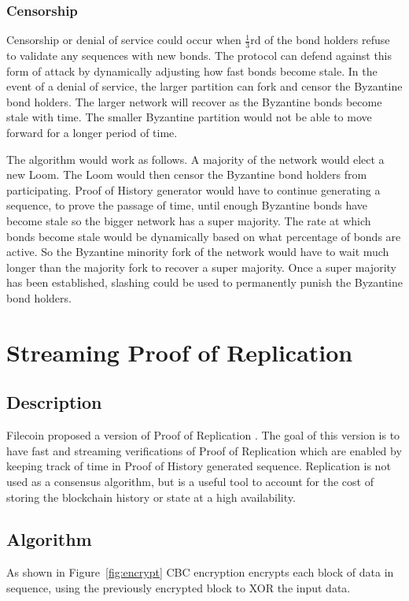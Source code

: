\documentclass[12pt]{article}
\begin{document}
\subsubsection{Censorship}\label{censorship}
Censorship or denial of service could occur when \(\frac{1}{3}\)rd of the bond holders refuse to validate any sequences with new bonds. The protocol can defend against this form of attack by dynamically adjusting how fast bonds become stale. In the event of a denial of service, the larger partition can fork and censor the Byzantine bond holders. The larger network will recover as the Byzantine bonds become stale with time. The smaller Byzantine partition would not be able to move forward for a longer period of time. 

The algorithm would work as follows.  A majority of the network would elect a new Loom.  The Loom would then censor the Byzantine bond holders from participating.  Proof of History generator would have to continue generating a sequence, to prove the passage of time, until enough Byzantine bonds have become stale so the bigger network has a super majority.  The rate at which bonds become stale would be dynamically based on what percentage of bonds are active.  So the Byzantine minority fork of the network would have to wait much longer than the majority fork to recover a super majority.  Once a super majority has been established, slashing could be used to permanently punish the Byzantine bond holders.

\section{Streaming Proof of Replication}\label{porep}
\subsection{Description}
Filecoin proposed a version of Proof of Replication \cite{filecoinporep}. The goal of this version is to have fast and streaming verifications of Proof of Replication which are enabled by keeping track of time in Proof of History generated sequence. Replication is not used as a consensus algorithm, but is a useful tool to account for the cost of storing the blockchain history or state at a high availability.
\subsection{Algorithm}
As shown in Figure~\ref{fig:encrypt} CBC encryption encrypts each block of data in sequence, using the previously encrypted block to XOR the input data.
\end{document}
